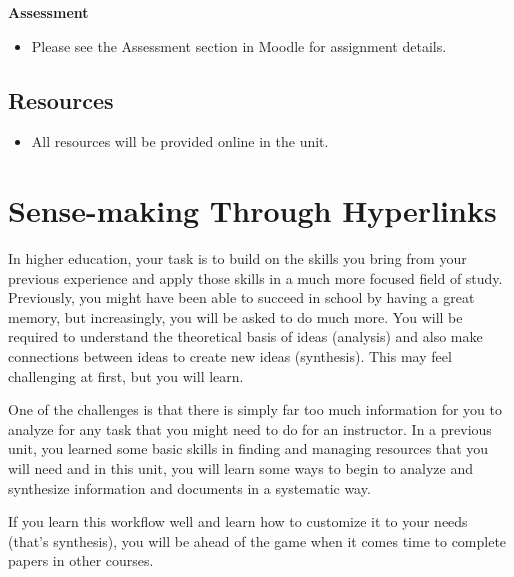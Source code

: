 \documentclass[
  letterpaper,
  DIV=11,
  numbers=noendperiod]{scrreprt}
\providecommand{\tightlist}{%
  \setlength{\itemsep}{0pt}\setlength{\parskip}{0pt}}\usepackage{longtable,booktabs,array}
\begin{document}
\begin{tcolorbox}[enhanced jigsaw, toprule=.15mm, colback=white, colframe=quarto-callout-note-color-frame, arc=.35mm, opacityback=0, breakable, rightrule=.15mm, bottomrule=.15mm, leftrule=.75mm, left=2mm]

\textbf{Assessment}

\begin{itemize}
\tightlist
\item
  Please see the Assessment section in Moodle for assignment details.
\end{itemize}

\end{tcolorbox}

\subsection*{Resources}\label{resources-2}

\begin{itemize}
\tightlist
\item
  All resources will be provided online in the unit.
\end{itemize}

\section{Sense-making Through
Hyperlinks}\label{sense-making-through-hyperlinks}

In higher education, your task is to build on the skills you bring from
your previous experience and apply those skills in a much more focused
field of study. Previously, you might have been able to succeed in
school by having a great memory, but increasingly, you will be asked to
do much more. You will be required to understand the theoretical basis
of ideas (analysis) and also make connections between ideas to create
new ideas (synthesis). This may feel challenging at first, but you will
learn.

One of the challenges is that there is simply far too much information
for you to analyze for any task that you might need to do for an
instructor. In a previous unit, you learned some basic skills in finding
and managing resources that you will need and in this unit, you will
learn some ways to begin to analyze and synthesize information and
documents in a systematic way.

If you learn this workflow well and learn how to customize it to your
needs (that's synthesis), you will be ahead of the game when it comes
time to complete papers in other courses.
\end{document}
